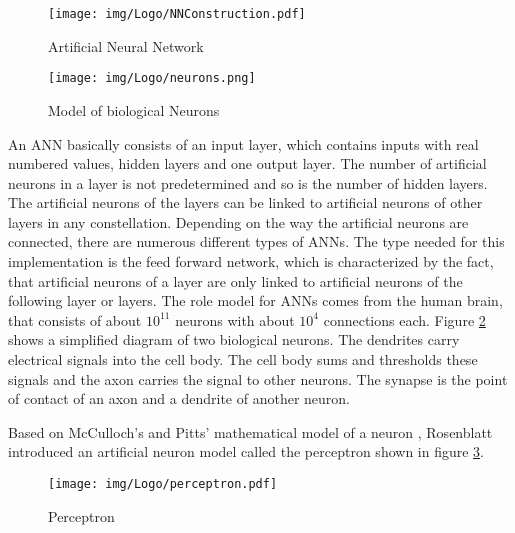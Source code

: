 \begin{figure} 
	\centering
	\texttt{[image: img/Logo/NNConstruction.pdf]}
	\caption{Artificial Neural Network}
	\label{fig:NNConstruction}
\end{figure}

\begin{figure} 
	\centering
	\texttt{[image: img/Logo/neurons.png]}
	\caption{Model of biological Neurons}
	\label{fig:neurons}
\end{figure}

An ANN basically consists of an input layer, which contains inputs with real numbered values, hidden layers and one output layer. The number of artificial neurons in a layer is not predetermined and so is the number of hidden layers. The artificial neurons of the layers can be linked to artificial neurons of other layers in any constellation. Depending on the way the artificial neurons are connected, there are numerous different types of ANNs. The type needed for this implementation is the feed forward network, which is characterized by the fact, that artificial neurons of a layer are only linked to artificial neurons of the following layer or layers. \cite{schmidhuber2015deep} \cite{shanmuganathan2016artificial}
The role model for ANNs comes from the human brain, that consists of about $10^{11}$ neurons with about $10^4$ connections each. Figure \ref{fig:neurons} shows a simplified diagram of two biological neurons. The dendrites carry electrical signals into the cell body. The cell body sums and thresholds these signals and the axon carries the signal to other neurons. The synapse is the point of contact of an axon and a dendrite of another neuron.\cite{CI} 

Based on McCulloch's and Pitts' mathematical model of a neuron \cite{pitts1947we}, Rosenblatt introduced an artificial neuron model called the perceptron \cite{rosenblatt1958perceptron} shown in figure \ref{fig:perceptron}.

\begin{figure} 
	\centering
	\texttt{[image: img/Logo/perceptron.pdf]}
	\caption{Perceptron}
	\label{fig:perceptron}
\end{figure}

